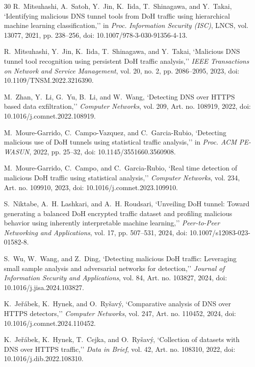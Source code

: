 \documentclass[conference]{IEEEtran}
\begin{document}
\begin{thebibliography}{30}
R.~Mitsuhashi, A.~Satoh, Y.~Jin, K.~Iida, T.~Shinagawa, and Y.~Takai, `Identifying malicious DNS tunnel tools from DoH traffic using hierarchical machine learning classification,'' in \emph{Proc. Information Security (ISC)}, LNCS, vol. 13077, 2021, pp. 238--256, doi: 10.1007/978-3-030-91356-4-13.

R.~Mitsuhashi, Y.~Jin, K.~Iida, T.~Shinagawa, and Y.~Takai, `Malicious DNS tunnel tool recognition using persistent DoH traffic analysis,'' \emph{IEEE Transactions on Network and Service Management}, vol. 20, no. 2, pp. 2086--2095, 2023, doi: 10.1109/TNSM.2022.3216390.

M.~Zhan, Y.~Li, G.~Yu, B.~Li, and W.~Wang, `Detecting DNS over HTTPS based data exfiltration,'' \emph{Computer Networks}, vol. 209, Art. no. 108919, 2022, doi: 10.1016/j.comnet.2022.108919.

M.~Moure-Garrido, C.~Campo-Vazquez, and C.~Garcia-Rubio, `Detecting malicious use of DoH tunnels using statistical traffic analysis,'' in \emph{Proc. ACM PE-WASUN}, 2022, pp. 25--32, doi: 10.1145/3551660.3560908.

M.~Moure-Garrido, C.~Campo, and C.~Garcia-Rubio, `Real time detection of malicious DoH traffic using statistical analysis,'' \emph{Computer Networks}, vol. 234, Art. no. 109910, 2023, doi: 10.1016/j.comnet.2023.109910.

S.~Niktabe, A.~H. Lashkari, and A.~H. Roudsari, `Unveiling DoH tunnel: Toward generating a balanced DoH encrypted traffic dataset and profiling malicious behavior using inherently interpretable machine learning,'' \emph{Peer-to-Peer Networking and Applications}, vol. 17, pp. 507--531, 2024, doi: 10.1007/s12083-023-01582-8.

S.~Wu, W.~Wang, and Z.~Ding, `Detecting malicious DoH traffic: Leveraging small sample analysis and adversarial networks for detection,'' \emph{Journal of Information Security and Applications}, vol. 84, Art. no. 103827, 2024, doi: 10.1016/j.jisa.2024.103827.

K.~Je\v{r}\'abek, K.~Hynek, and O.~Ry\v{s}av\'y, `Comparative analysis of DNS over HTTPS detectors,'' \emph{Computer Networks}, vol. 247, Art. no. 110452, 2024, doi: 10.1016/j.comnet.2024.110452.

K.~Je\v{r}\'abek, K.~Hynek, T.~Cejka, and O.~Ry\v{s}av\'y, `Collection of datasets with DNS over HTTPS traffic,'' \emph{Data in Brief}, vol. 42, Art. no. 108310, 2022, doi: 10.1016/j.dib.2022.108310.


\end{thebibliography}
\end{document}
